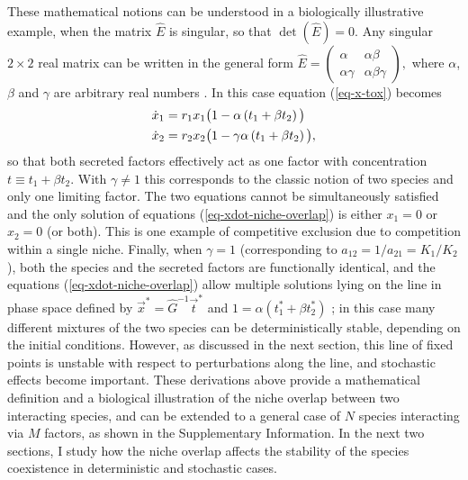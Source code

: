 These mathematical notions can be understood in a biologically illustrative example, when the matrix $\hat{E}$ is singular, so that $\det(\hat{E})=0$. Any singular $2\times 2$ real matrix can be written in the general form  $\hat{E}=\begin{pmatrix}
\alpha   & \alpha\beta \\
\alpha\gamma & \alpha\beta\gamma
\end{pmatrix},$
where $\alpha$, $\beta$ and $\gamma$ are arbitrary real numbers \cite{Larson2016}. 
In this case equation (\ref{eq-x-tox}) becomes
\begin{align}
\dot{x}_1 &= r_1 x_1\big(1 -        \alpha\left( t_1 + \beta t_2 \right) \big) \notag \\
\dot{x}_2 &= r_2 x_2\big(1 - \gamma \alpha\left( t_1 + \beta t_2 \right) \big),
\label{eq-xdot-niche-overlap}
\end{align}
so that both secreted factors effectively act as one factor with concentration  $t\equiv t_1 + \beta t_2$. With $\gamma\neq 1$ this corresponds to the classic notion of two species and only one limiting factor. The two equations cannot be simultaneously satisfied and the only solution of equations (\ref{eq-xdot-niche-overlap}) is either $x_1=0$ or $x_2=0$ (or both). This is one example of competitive exclusion due to competition within a single niche.
Finally, when $\gamma=1$ (corresponding to  $a_{12}=1/a_{21}=K_1/K_2$), both the species and the secreted factors are functionally identical, and the equations (\ref{eq-xdot-niche-overlap}) allow multiple solutions lying on the line in phase space defined by $\vec{x}^*=\hat{G}^{-1}\vec{t}^*$  and $1=\alpha\left( t_1^* + \beta t_2^* \right)$ \cite{McGehee1977a,Constable2015}; in this case many different mixtures of the two species can be deterministically stable, depending on the initial conditions. However, as discussed in the next section, this line of fixed points is unstable with respect to perturbations along the line, and stochastic effects become important. These derivations above provide a mathematical definition and a biological illustration of the niche overlap between two interacting species, and can be extended to a general case of $N$ species interacting via $M$ factors, as shown in the Supplementary Information. 
In the next two sections, I study how the niche overlap affects the stability of the species coexistence in deterministic and stochastic cases.



